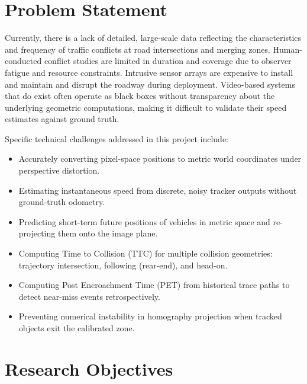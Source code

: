 \documentclass[12pt]{report}
\begin{document}
\section{Problem Statement}

Currently, there is a lack of detailed, large-scale data reflecting the characteristics and frequency of traffic conflicts at road intersections and merging zones.
Human-conducted conflict studies are limited in duration and coverage due to observer fatigue and resource constraints.
Intrusive sensor arrays are expensive to install and maintain and disrupt the roadway during deployment.
Video-based systems that do exist often operate as black boxes without transparency about the underlying geometric computations, making it difficult to validate their speed estimates against ground truth.

Specific technical challenges addressed in this project include:

\begin{itemize}
    \item Accurately converting pixel-space positions to metric world coordinates under perspective distortion.
    \item Estimating instantaneous speed from discrete, noisy tracker outputs without ground-truth odometry.
    \item Predicting short-term future positions of vehicles in metric space and re-projecting them onto the image plane.
    \item Computing Time to Collision (TTC) for multiple collision geometries: trajectory intersection, following (rear-end), and head-on.
    \item Computing Post Encroachment Time (PET) from historical trace paths to detect near-miss events retrospectively.
    \item Preventing numerical instability in homography projection when tracked objects exit the calibrated zone.
\end{itemize}

\section{Research Objectives}
\end{document}
